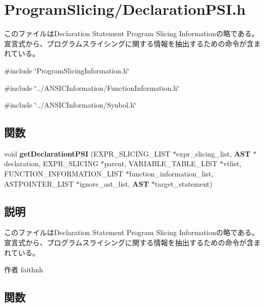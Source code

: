 \section{ProgramSlicing/DeclarationPSI.h}
\label{DeclarationPSI_8h}


このファイルはDeclaration Statement Program Slicing Informationの略である。 宣言式から、プログラムスライシングに関する情報を抽出するための命令が含まれている。  


{\ttfamily \#include \char`\"{}ProgramSlicingInformation.h\char`\"{}}\par
{\ttfamily \#include \char`\"{}../ANSICInformation/FunctionInformation.h\char`\"{}}\par
{\ttfamily \#include \char`\"{}../ANSICInformation/Synbol.h\char`\"{}}\par
\subsection*{関数}
\begin{DoxyCompactItemize}
\item 
void {\bf getDeclarationtPSI} (EXPR\_\-SLICING\_\-LIST $\ast$expr\_\-slicing\_\-list, {\bf AST} $\ast$declaration, EXPR\_\-SLICING $\ast$parent, VARIABLE\_\-TABLE\_\-LIST $\ast$vtlist, FUNCTION\_\-INFORMATION\_\-LIST $\ast$function\_\-information\_\-list, ASTPOINTER\_\-LIST $\ast$ignore\_\-ast\_\-list, {\bf AST} $\ast$target\_\-statement)
\end{DoxyCompactItemize}


\subsection{説明}
このファイルはDeclaration Statement Program Slicing Informationの略である。 宣言式から、プログラムスライシングに関する情報を抽出するための命令が含まれている。 \begin{DoxyAuthor}{作者}
faithnh 
\end{DoxyAuthor}


\subsection{関数}
